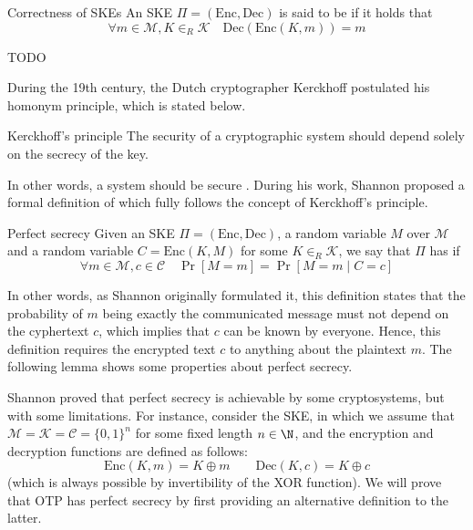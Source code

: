 \documentclass[a4paper, 12pt]{report}
\begin{document}
\begin{frameddefn}{Correctness of SKEs}
	An SKE $\Pi = (\mbox{Enc}, \mbox{Dec})$ is said to be  if it holds that $$\forall m \in \mathcal M, K \in_R \mathcal K \quad \mbox{Dec}(\mbox{Enc}(K, m)) = m$$
\end{frameddefn}

TODO 

During the 19th century, the Dutch cryptographer Kerckhoff postulated his homonym principle, which is stated below.

\begin{framedprinc}{Kerckhoff's principle}
	The security of a cryptographic system should depend solely on the secrecy of the key.
\end{framedprinc}

In other words, a system should be secure . During his work, Shannon proposed a formal definition of  which fully follows the concept of Kerckhoff's principle.

\begin{frameddefn}{Perfect secrecy}
	Given an SKE $\Pi = (\mbox{Enc}, \mbox{Dec})$, a random variable $M$ over $\mathcal M$ and a random variable $C = \mbox{Enc}(K, M)$ for some $K \in_R \mathcal K$, we say that $\Pi$ has  if $$\forall m \in \mathcal M, c \in \mathcal C \quad \Pr[M = m] = \Pr[M = m \mid C = c]$$
\end{frameddefn}

In other words, as Shannon originally formulated it, this definition states that the probability of $m$ being exactly the communicated message must not depend on the cyphertext $c$, which implies that $c$ can be known by everyone. Hence, this definition requires the encrypted text $c$ to  anything about the plaintext $m$. The following lemma shows some properties about perfect secrecy.

Shannon proved that perfect secrecy is achievable by some cryptosystems, but with some limitations. For instance, consider the  SKE, in which we assume that $\mathcal M = \mathcal K = \mathcal C = \{0, 1\}^n$ for some fixed length $n \in \N$, and the encryption and decryption functions are defined as follows: $$\mbox{Enc}(K, m) = K \oplus m \quad \quad \mbox{Dec}(K, c) = K \oplus c$$ (which is always possible by invertibility of the XOR function). We will prove that OTP has perfect secrecy by first providing an alternative definition to the latter.
\end{document}

